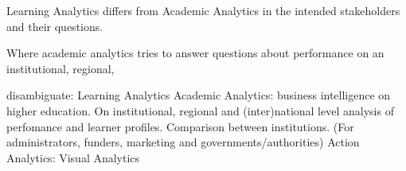 \documentclass[11pt]{article}
\begin{document}





\newpage
Learning Analytics differs from Academic Analytics in the intended stakeholders and their questions. 

Where academic analytics tries to answer questions about performance on an institutional, regional, 

disambiguate:
Learning Analytics
Academic Analytics: business intelligence on higher education. On institutional, regional and (inter)national level analysis of perfomance and learner profiles. Comparison between institutions. (For administrators, funders, marketing and governments/authorities)
Action Analytics: 
Visual Analytics
\end{document}
